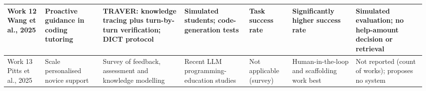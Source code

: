 \begin{landscape}
\begin{longtable}{|R{2.2cm}|R{2.6cm}|R{3.5cm}|R{2.7cm}|R{3.0cm}|R{2.9cm}|R{3.3cm}|}
Work 12 \cite{wang2025} Wang et al., 2025 & Proactive guidance in coding tutoring & TRAVER: knowledge tracing plus turn-by-turn verification; DICT protocol & Simulated students; code-generation tests & Task success rate & Significantly higher success rate & Simulated evaluation; no help-amount decision or retrieval\\\hline
Work 13 \cite{pitts2025} Pitts et al., 2025 & Scale personalised novice support & Survey of feedback, assessment and knowledge modelling & Recent LLM programming-education studies & Not applicable (survey) & Human-in-the-loop and scaffolding work best & Not reported (count of works); proposes no system\\\hline
\end{longtable}\endgroup\end{landscape}
